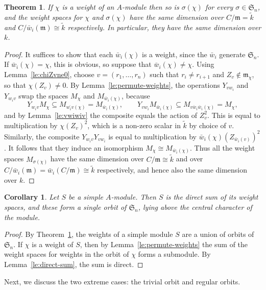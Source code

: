\documentclass[12pt]{amsart}
\newcommand{\sym}[1]{\mathfrak{S}_{#1}}
\newcommand{\mfm}{\mathfrak{m}}
\numberwithin{equation}{section}
\newtheorem{theorem}[equation]{Theorem}
\newtheorem{corollary}[equation]{Corollary}
\theoremstyle{definition}
\begin{document}
\begin{theorem}\label{th:weights}
If $\chi$ is a weight of an $A$-module then so is $\sigma(\chi)$ for
every $\sigma\in\sym{n}$, and the weight spaces for $\chi$ and
$\sigma(\chi)$ have the same dimension over $C/\mfm= \tilde k$ and
$C/\bar
w_i(\mfm)\cong\tilde k$ respectively. In particular, they have the same dimension
over $k$.
\end{theorem}
\begin{proof}
It suffices to show that each $\bar w_i(\chi)$ is
a weight, since the $\bar w_i$ generate $\sym{n}$. 
If $\bar w_i(\chi)=\chi$, this is obvious, so suppose that 
$\bar w_i(\chi)\ne \chi$. Using Lemma~\ref{le:chiZvne0}, choose
$v=(r_1,\dots,r_n)$ such that $r_i\ne r_{i+1}$ and
$Z_v\not\in\mfm_\chi$, so that $\chi(Z_v)\ne 0$. By
Lemma~\ref{le:permute-weights}, the operations 
$Y_{vw_i}$ and $Y_{w_iv}$ swap the spaces $M_{\chi}$ and
$M_{\bar w_i(\chi)}$, because 
\[ Y_{w_iv}M_\chi\subseteq M_{\overline{w_iv}(\chi)}
=M_{\bar w_i(\chi)},\qquad
Y_{vw_i}M_{\bar w_i(\chi)}\subseteq M_{\overline{vw_i}\bar
  w_i(\chi)}=M_\chi, \]
and by Lemma~\ref{le:vwiwiv} the composite
equals the action of $Z_v^2$. 
This is equal to multiplication by
$\chi(Z_{v})^2$, which is a non-zero scalar in $\tilde k$ by
choice of $v$. Similarly, the composite $Y_{w_iv}Y_{vw_i}$ is equal
to multiplication by $\bar w_i(\chi)(Z_{\bar w_i(v)})^2$.  It follows that they induce an 
isomorphism $M_{\chi}\cong M_{\bar w_i(\chi)}$. Thus all the
weight spaces $M_{\sigma(\chi)}$ have the same dimension over $C/\mfm\cong\tilde
k$ and over $C/\bar w_i(\mfm)=\bar w_i(C/\mfm)\cong \tilde k$
respectively, and hence also the same dimension over $k$. 
\end{proof}




\begin{corollary}\label{co:weights}
Let $S$ be a simple $A$-module. Then $S$ is the direct sum of its
weight spaces, and these form a single orbit of $\sym{n}$,
lying above the central character of the module.
\end{corollary}
\begin{proof}
By Theorem~\ref{th:weights}, the weights of a simple module $S$ are a
union of orbits of $\sym{n}$.
If $\chi$ is a weight of $S$, then by Lemma~\ref{le:permute-weights}
the sum of the weight spaces for weights in the orbit of $\chi$ forms
a submodule. By Lemma~\ref{le:direct-sum}, the sum is direct.
\end{proof}

Next, we discuss the two extreme cases: the trivial orbit and regular orbits.
\end{document}
